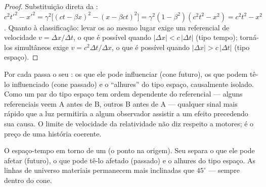 \begin{proof}
Substituição direta da :
$c^2t'^2 - x'^2 = \gamma^2\big[(ct - \beta x)^2 - (x - \beta ct)^2
\big] = \gamma^2(1 - \beta^2)(c^2t^2 - x^2) = c^2t^2 - x^2$.
Quanto à classificação: levar os  ao mesmo lugar exige um
referencial de velocidade $v = \Delta x/\Delta t$, o que é possível
quando $|\Delta x| <
c\,|\Delta t|$ (tipo tempo); torná-los simultâneos exige $v =
c^2\Delta t/\Delta x$, o que é possível quando $|\Delta x| > c\,|\Delta t|$
(tipo espaço).
\end{proof}

\begin{remark}\label{rem:b3:relativistic-kinematics:causality}
Por cada  passa o seu \emph{}: os  que ele pode
influenciar (cone futuro), os que podem tê-lo influenciado (cone
passado) e o ``alhures'' do tipo espaço, causalmente isolado. Como um
par do tipo espaço tem ordem dependente do referencial --- alguns
referenciais veem A antes de B, outros B antes de A --- qualquer sinal
mais rápido que a luz permitiria a algum observador assistir a um
efeito precedendo sua causa. O limite de velocidade da relatividade não
diz respeito a motores; é o preço de uma história coerente.
\end{remark}

\begin{omfigure}

{\small O espaço-tempo em torno de um  (o ponto na origem). Seu
 separa o que ele pode afetar (futuro), o que pode tê-lo
afetado (passado) e o alhures do tipo espaço. As linhas de universo
materiais permanecem mais inclinadas que $45^\circ$ --- sempre dentro
do cone.}
\end{omfigure}

